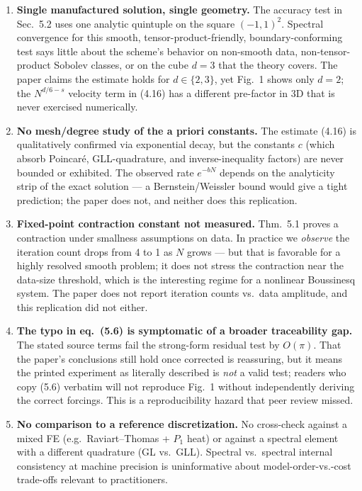 \documentclass[11pt]{article}
\begin{document}
\begin{enumerate}[leftmargin=1.4em]
\item \textbf{Single manufactured solution, single geometry.} The accuracy test in Sec.~5.2 uses
one analytic quintuple on the square $(-1,1)^2$. Spectral convergence for this smooth,
tensor-product-friendly, boundary-conforming test says little about the scheme's behavior on
non-smooth data, non-tensor-product Sobolev classes, or on the cube $d=3$ that the theory covers.
The paper claims the estimate holds for $d\in\{2,3\}$, yet Fig.~1 shows only $d=2$; the $N^{d/6-s}$
velocity term in (4.16) has a different pre-factor in 3D that is never exercised numerically.

\item \textbf{No mesh/degree study of the a priori constants.} The estimate (4.16) is qualitatively
confirmed via exponential decay, but the constants $c$ (which absorb Poincar\'e, GLL-quadrature,
and inverse-inequality factors) are never bounded or exhibited. The observed rate $e^{-bN}$
depends on the analyticity strip of the exact solution --- a Bernstein/Weissler bound would give a
tight prediction; the paper does not, and neither does this replication.

\item \textbf{Fixed-point contraction constant not measured.} Thm.~5.1 proves a contraction under
smallness assumptions on data. In practice we \emph{observe} the iteration count drops from 4 to
1 as $N$ grows --- but that is favorable for a highly resolved smooth problem; it does not stress
the contraction near the data-size threshold, which is the interesting regime for a nonlinear
Boussinesq system. The paper does not report iteration counts vs.\ data amplitude, and this
replication did not either.

\item \textbf{The typo in eq.~(5.6) is symptomatic of a broader traceability gap.} The stated
source terms fail the strong-form residual test by $O(\pi)$. That the paper's conclusions still
hold once corrected is reassuring, but it means the printed experiment as literally described is
\emph{not} a valid test; readers who copy (5.6) verbatim will not reproduce Fig.~1 without
independently deriving the correct forcings. This is a reproducibility hazard that peer review
missed.

\item \textbf{No comparison to a reference discretization.} No cross-check against a mixed FE
(e.g.\ Raviart--Thomas + $P_1$ heat) or against a spectral element with a different quadrature
(GL vs.\ GLL). Spectral vs.\ spectral internal consistency at machine precision is uninformative
about model-order-vs.-cost trade-offs relevant to practitioners.


\end{enumerate}
\end{document}
